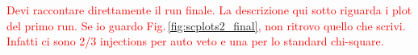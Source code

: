 \documentclass[binding=0.6cm, LaM]{sapthesis}
\newcommand{\fpg}[1]{\textcolor{red}{#1} }
\begin{document}
\fpg{Devi raccontare direttamente il run finale.  La descrizione qui sotto riguarda i plot del primo run.  Se io guardo Fig.\,\ref{fig:scplots2_final}, non ritrovo quello che scrivi.  Infatti ci sono 2/3 injections per auto veto e una per lo standard chi-square.} 

	
\end{document}
